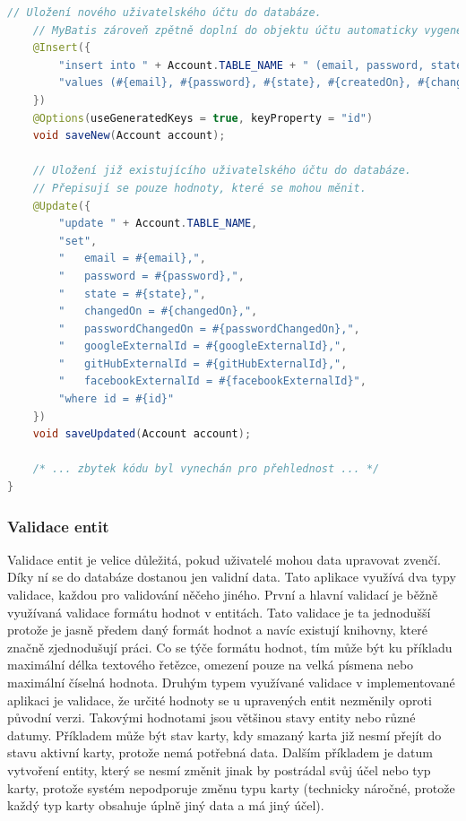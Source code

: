 \begin{itemize}
\begin{itemize}
\begin{lstlisting}[language=Java]
	// Uložení nového uživatelského účtu do databáze.
	// MyBatis zároveň zpětně doplní do objektu účtu automaticky vygenerované unikátní ID databází.
	@Insert({
		"insert into " + Account.TABLE_NAME + " (email, password, state, createdOn, changedOn, passwordChangedOn, googleExternalId, gitHubExternalId, facebookExternalId)",
		"values (#{email}, #{password}, #{state}, #{createdOn}, #{changedOn}, #{passwordChangedOn}, #{googleExternalId}, #{gitHubExternalId}, #{facebookExternalId})"
	})
	@Options(useGeneratedKeys = true, keyProperty = "id")
	void saveNew(Account account);

	// Uložení již existujícího uživatelského účtu do databáze.
	// Přepisují se pouze hodnoty, které se mohou měnit.
	@Update({
		"update " + Account.TABLE_NAME,
		"set",
		"   email = #{email},",
		"   password = #{password},",
		"   state = #{state},",
		"   changedOn = #{changedOn},",
		"   passwordChangedOn = #{passwordChangedOn},",
		"   googleExternalId = #{googleExternalId},",
		"   gitHubExternalId = #{gitHubExternalId},",
		"   facebookExternalId = #{facebookExternalId}",
		"where id = #{id}"
	})
	void saveUpdated(Account account);

	/* ... zbytek kódu byl vynechán pro přehlednost ... */
}
		\end{lstlisting}

		\subsubsection{Validace entit}

		Validace entit je velice důležitá, pokud uživatelé mohou data upravovat zvenčí.
		Díky ní se do databáze dostanou jen validní data.
		Tato aplikace využívá dva typy validace, každou pro validování něčeho jiného.
		První a hlavní validací je běžně využívaná validace formátu hodnot v entitách.
		Tato validace je ta jednodušší protože je jasně předem daný formát hodnot a navíc existují knihovny, které
		značně zjednodušují práci.
		Co se týče formátu hodnot, tím může být ku příkladu maximální délka textového řetězce, omezení pouze na velká
		písmena nebo maximální číselná hodnota.
		Druhým typem využívané validace v implementované aplikaci je validace, že určité hodnoty se u upravených entit
		nezměnily oproti původní verzi.
		Takovými hodnotami jsou většinou stavy entity nebo různé datumy.
		Příkladem může být stav karty, kdy smazaný karta již nesmí přejít do stavu aktivní karty, protože nemá potřebná data.
		Dalším příkladem je datum vytvoření entity, který se nesmí změnit jinak by postrádal svůj účel nebo typ karty,
		protože systém nepodporuje změnu typu karty (technicky náročné, protože každý typ karty obsahuje úplně jiný data
		a má jiný účel).


\end{itemize}
\end{itemize}

